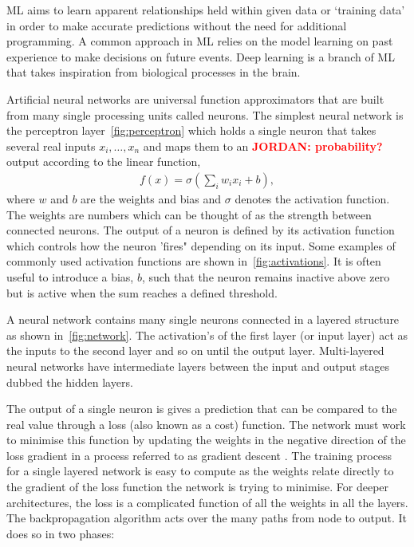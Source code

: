 \documentclass[12pt]{iopart}
\newcommand{\jordan}[1]{\textbf{\textcolor{red}{JORDAN: #1}}}
\newcommand{\chris}[1]{\textbf{\textcolor{green}{CHRIS: #1}}}
\begin{document}
\ac{ML} aims to learn apparent relationships held within given data or `training
data' in order to make accurate predictions without the need for additional
programming. A common approach in \ac{ML} relies on the model learning on
past experience to make decisions on future events. Deep learning is a branch of \ac{ML} that takes inspiration from biological processes in the brain. 

%

Artificial neural networks are universal function approximators that are built from many single
processing units called neurons. The simplest neural network is the perceptron
layer~\cref{fig:perceptron} which holds a single neuron that takes several real
inputs $x_{i},\ldots, x_{n}$
and maps them to an \jordan{probability?} output according to the linear function, 
%
\begin{align}
f(x) = \sigma(\sum_i w_i x_i + b),
\label{eqn:neuron}
\end{align}
%
where $w$ and $b$ are the weights and bias and $\sigma$
denotes the activation function. The weights are numbers which can be thought
of as the strength between connected neurons. The output of a neuron is defined by its activation function which controls how the neuron 'fires" depending on its input. Some examples of commonly used activation functions are shown in~\cref{fig:activations}. It is often useful to introduce a bias, $b$, such that the neuron remains inactive
above zero but is active when the sum reaches a defined threshold. 

%
A neural network contains many single neurons connected in a layered structure
as shown in~\cref{fig:network}. The activation's of the first layer (or
input layer) act as the inputs to the second layer and so on until the output
layer. Multi-layered neural networks have intermediate layers between the input
and output stages dubbed the hidden layers.

%
The output of a single neuron is gives a
prediction that can be compared to the real value through a loss (also known as a
cost) function. The network must work to minimise this function by updating the weights in the negative
direction of the loss gradient in a process referred to as gradient
descent \cite{ruder2016overview}. The training process for a single layered network is easy to compute as the weights relate directly to the gradient of the loss function the network is trying to minimise. For deeper architectures, the loss is a complicated function of all the weights in all the layers. The backpropagation \cite{Nielsen1992} algorithm acts over the many paths from node to output. It does so in two phases:
\end{document}
